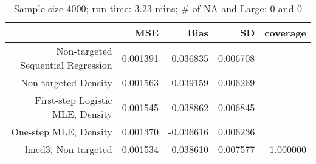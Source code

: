 \begin{table}[ht]
\centering
\caption{Sample size 4000; run time: 3.23 mins; # of NA and Large:  0 and 0} 
\begin{tabular}{rrrrr}
  \hline
 & MSE & Bias & SD & coverage \\ 
  \hline
Non-targeted Sequential Regression & 0.001391 & -0.036835 & 0.006708 &  \\ 
  Non-targeted Density & 0.001563 & -0.039159 & 0.006269 &  \\ 
  First-step Logistic MLE, Density & 0.001545 & -0.038862 & 0.006845 &  \\ 
  One-step MLE, Density & 0.001370 & -0.036616 & 0.006236 &  \\ 
  lmed3, Non-targeted & 0.001534 & -0.038610 & 0.007577 & 1.000000 \\ 
   \hline
\end{tabular}
\end{table}
